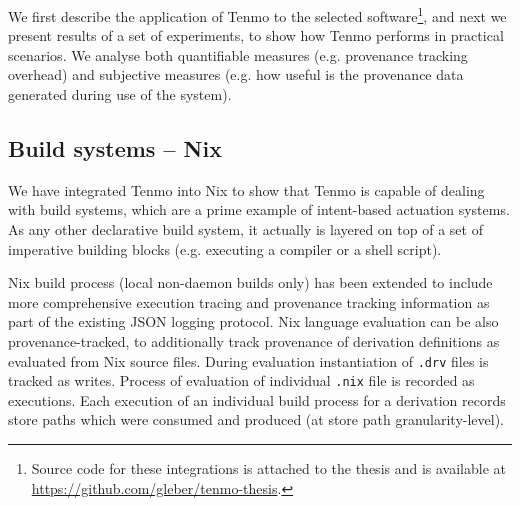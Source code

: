 We first describe the application of Tenmo to the selected software\footnote{Source code for these integrations is attached to the thesis and is available at \url{https://github.com/gleber/tenmo-thesis}.}, and next we present results of a set of experiments, to show how Tenmo performs in practical scenarios. We analyse both quantifiable measures (e.g. provenance tracking overhead) and subjective measures (e.g. how useful is the provenance data generated during use of the system).

\subsection{Build systems -- Nix}\label{sec:nix-implementation}

We have integrated Tenmo into Nix to show that Tenmo is capable of dealing with build systems, which are a prime example of intent-based actuation systems. As any other declarative build system, it actually is layered on top of a set of imperative building blocks (e.g. executing a compiler or a shell script).

Nix build process (local non-daemon builds only) has been extended to include more comprehensive execution tracing and provenance tracking information as part of the existing JSON logging protocol. Nix language evaluation can be also provenance-tracked, to additionally track provenance of derivation definitions as evaluated from Nix source files. During evaluation instantiation of \texttt{.drv} files is tracked as writes. Process of evaluation of individual \texttt{.nix} file is recorded as executions. Each execution of an individual build process for a derivation records store paths which were consumed and produced (at store path granularity-level).

